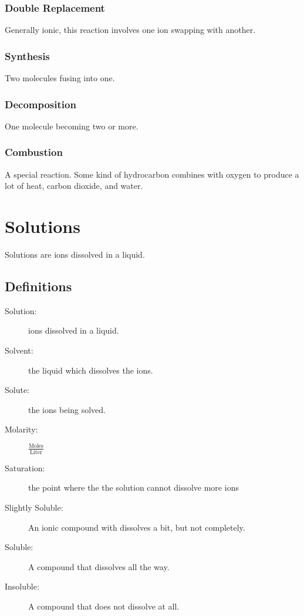 \documentclass[]{article}
\begin{document}
\subsubsection{Double Replacement}
Generally ionic, this reaction involves one ion swapping with another. 
\subsubsection{Synthesis}
Two molecules fusing into one. 
\subsubsection{Decomposition}
One molecule becoming two or more. 
\subsubsection{Combustion}
A special reaction. Some kind of hydrocarbon combines with oxygen to produce a lot of heat, carbon dioxide, and water.

\section{Solutions}
Solutions are ions dissolved in a liquid.
\subsection{Definitions}
\begin{description}
\item[Solution:] ions dissolved in a liquid.
\item[Solvent:] the liquid which dissolves the ions.
\item[Solute:] the ions being solved.
\item[Molarity:] $ \frac{\text{Moles}}{\text{Liter}} $
\item[Saturation:] the point where the the solution cannot dissolve more ions
\item[Slightly Soluble:] An ionic compound with dissolves a bit, but not completely.
\item[Soluble:] A compound that dissolves all the way.
\item[Insoluble:] A compound that does not dissolve at all.
\end{description}
\end{document}
